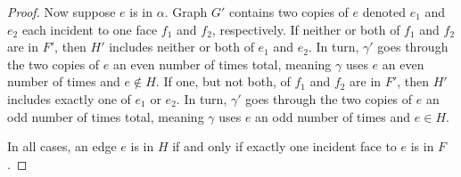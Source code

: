 \documentclass[letterpaper,review]{siamart190516}
\def\snip{\mathbin{\raisebox{0.15ex}{\rotatebox[origin=c]{60}{\Rightscissors}\!}}}
\def\snip{\mathbin{\backslash\!\!\backslash}}
\def\subsnip{\mathbin{\raisebox{0.15ex}{\rotatebox[origin=c]{60}{\footnotesize\Rightscissors}\!}}}
\def\Gsnip{\mathord{G_{\subsnip}}}
\def\gammasnip{\mathord{\gamma_{\subsnip}}}
\def\Gsnip{G'}
\def\Fsnip{F'}
\def\gammasnip{\gamma'}
\def\Hsnip{H'}
\begin{document}
{\begin{proof}
Now suppose $e$ is in $\alpha$.
Graph $\Gsnip$ contains two copies of $e$ denoted $e_1$ and $e_2$ each incident to one face $f_1$
and $f_2$, respectively.
If neither or both of $f_1$ and $f_2$ are in $\Fsnip$, then $\Hsnip$ includes neither or both of
$e_1$ and $e_2$.
In turn, $\gammasnip$ goes through the two copies of $e$ an even number of times total, meaning
$\gamma$ uses $e$ an even number of times and $e \notin H$.
If one, but not both, of $f_1$ and $f_2$ are in $\Fsnip$, then $\Hsnip$ includes exactly one of
$e_1$ or $e_2$.
In turn, $\gammasnip$ goes through the two copies of $e$ an odd number of times total, meaning
$\gamma$ uses $e$ an odd number of times and $e \in H$.

In all cases, an edge $e$ is in $H$ if and only if exactly one incident face to $e$ is in $F$.
\end{proof}

}
\end{document}
